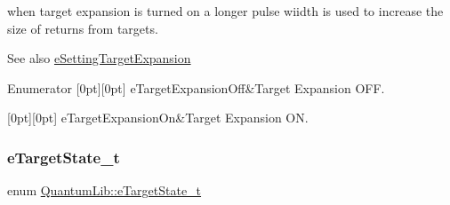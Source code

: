 when target expansion is turned on a longer pulse wiidth is used to increase the size of returns from targets. \begin{DoxySeeAlso}{See also}
\mbox{\hyperlink{namespace_quantum_lib_acc8124e3e65bca4aa798d03a55e3d54cae155e2cdb18bbf8e212235d18091e519}{e\+Setting\+Target\+Expansion}} 
\end{DoxySeeAlso}
\begin{DoxyEnumFields}{Enumerator}
[0pt][0pt]{}\mbox{\label{namespace_quantum_lib_affbc8bc0775b14917688e0e6d2fab0fba08ca29753d9913ebb2d4affbd443984a}} 
e\+Target\+Expansion\+Off&Target Expansion O\+FF. \\
\hline

[0pt][0pt]{}\mbox{\label{namespace_quantum_lib_affbc8bc0775b14917688e0e6d2fab0fba642e93b8e62df601860c5ea46328c0cf}} 
e\+Target\+Expansion\+On&Target Expansion ON. \\
\hline

\end{DoxyEnumFields}
\mbox{\label{namespace_quantum_lib_ab53e7395955c4dfb725e2ff41809ca9e}} 
\subsubsection{\texorpdfstring{e\+Target\+State\+\_\+t}{eTargetState\_t}}
{\footnotesize\ttfamily enum \mbox{\hyperlink{namespace_quantum_lib_ab53e7395955c4dfb725e2ff41809ca9e}{Quantum\+Lib\+::e\+Target\+State\+\_\+t}}}

